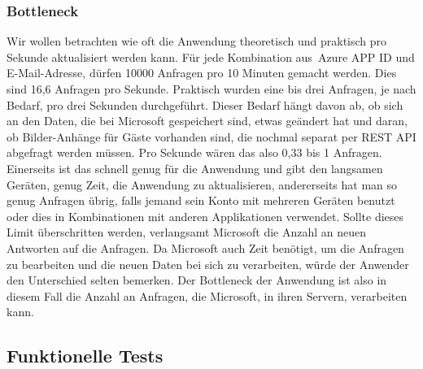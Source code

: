 \subsubsection{Bottleneck}\label{subsubsec:test-bottleneck}
\newline
\newline
{}
Wir wollen betrachten wie oft die Anwendung theoretisch und praktisch pro Sekunde aktualisiert werden kann.
Für jede Kombination aus~\gls{Azure APP ID} und E-Mail-Adresse, dürfen 10000 Anfragen pro 10 Minuten gemacht werden.
Dies sind 16,6 Anfragen pro Sekunde.
Praktisch wurden eine bis drei Anfragen, je nach Bedarf, pro drei Sekunden durchgeführt.
Dieser Bedarf hängt davon ab, ob sich an den Daten, die bei Microsoft gespeichert sind, etwas geändert hat und daran, ob Bilder-Anhänge für Gäste vorhanden sind, die nochmal separat per REST API abgefragt werden müssen.
Pro Sekunde wären das also 0,33 bis 1 Anfragen.
Einerseits ist das schnell genug für die Anwendung und gibt den langsamen Geräten, genug Zeit, die Anwendung zu aktualisieren, andererseits hat man so genug Anfragen übrig, falls jemand sein Konto mit mehreren Geräten benutzt oder dies in Kombinationen mit anderen Applikationen verwendet.
Sollte dieses Limit überschritten werden, verlangsamt Microsoft die Anzahl an neuen Antworten auf die Anfragen.
Da Microsoft auch Zeit benötigt, um die Anfragen zu bearbeiten und die neuen Daten bei sich zu verarbeiten, würde der Anwender den Unterschied selten bemerken.
Der \gls{Bottleneck} der Anwendung ist also in diesem Fall die Anzahl an Anfragen, die Microsoft, in ihren Servern, verarbeiten kann.
\newline
\newline
\subsection{Funktionelle Tests}\label{subsec:funktionelle-tests}
